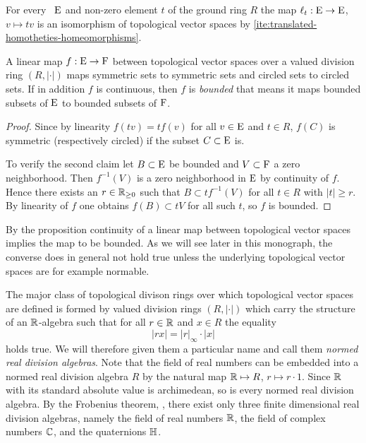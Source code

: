 \begin{example}
  For every \tvs~$\mathrm{E}$ and non-zero element $t$ of the ground ring $R$ the
  map $\ell_t :\mathrm{E} \to \mathrm{E}$, $v \mapsto tv$ is an isomorphism of topological vector spaces
  by  \ref{ite:translated-homotheties-homeomorphisms}.
\end{example}

\begin{propanddef}
  A linear map $f: \mathrm{E} \to \mathrm{F}$ between topological
  vector spaces over a valued division ring $(R,|\cdot|)$
  maps symmetric sets to symmetric sets and  circled sets to circled sets.
  If in addition $f$ is continuous, then $f$ is \emph{bounded} that means
  it  maps bounded subsets of $\mathrm{E}$ to bounded subsets of
  $\mathrm{F}$.   
\end{propanddef}

\begin{proof}
  Since by linearity $f(tv) = t f(v)$ for all $v\in \mathrm{E}$ and $t\in R$,
  $f (C)$ is symmetric (respectively circled) if the subset $C\subset \mathrm{E}$ is.

  To verify the second claim let $B\subset \mathrm{E}$ be bounded and
  $V\subset \mathrm{F}$ a zero neighborhood. Then $f^{-1} (V)$ is a zero neighborhood
  in $\mathrm{E}$ by continuity of $f$. Hence there exists an $r\in \mathbb{R}_{\geq 0}$
  such that $B \subset tf^{-1} (V)  $ for all $t\in R$ with $|t|\geq r$. By linearity
  of $f$ one obtains $f(B) \subset tV$ for all such $t$, so $f$ is bounded. 
\end{proof}

\begin{remark}
  By the proposition continuity of a linear map between topological vector spaces
  implies the map to be bounded. As we will see later in this monograph,
  the converse does in general not hold true unless the underlying
  topological vector spaces are for example normable. 
\end{remark}


\para
The major class of topological divison rings over which topological vector spaces are defined
is formed by valued division rings $(R,|\cdot|)$ which carry the structure of an
$\mathbb{R}$-algebra such that for all $r\in \mathbb{R}$ and $x\in R$ the equality
\[
         | rx | = |r|_\infty\cdot |x| 
\]
holds true. We will therefore given them a particular name and call them
\emph{normed real division algebras}. Note that the field of real numbers can be  embedded into
a normed real division algebra $R$ by the natural map $ \mathbb{R} \mapsto R$, $r \mapsto r\cdot 1$.  
Since $\mathbb{R}$ with its standard absolute value is archimedean, so is every normed real division algebra.
By the Frobenius theorem, \cite{FroLSBF}, there exist only three finite dimensional real division algebras,
namely the field of real numbers $\mathbb{R}$, the field of complex numbers $\mathbb{C}$, and the quaternions $\mathbb{H}$. 

